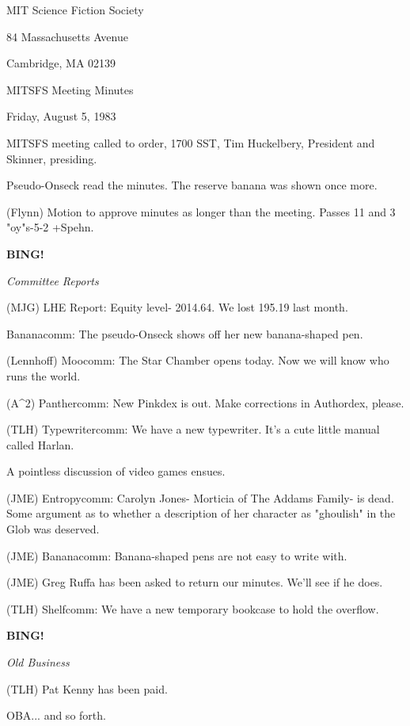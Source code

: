 \documentclass[12pt]{article}
\newcommand{\bing}{{\bf BING!} }
\newcommand{\goto}[1]{\bing \vskip 12pt \centerline{{\em{#1}}}}
\begin{document}
\begin{center}

MIT Science Fiction Society 

84 Massachusetts Avenue

Cambridge, MA 02139

\vspace{12pt}

MITSFS Meeting Minutes 

Friday, August 5, 1983

\end{center}
 
\vspace{18pt}

\setlength{\parskip}{6pt}

\noindent
MITSFS meeting called to order, 1700 SST,
Tim Huckelbery, President and Skinner, presiding.

Pseudo-Onseck read the minutes. The reserve banana was shown once more.

(Flynn) Motion to approve minutes as longer than the meeting. Passes 11 and 3 "oy"s-5-2 +Spehn.

\goto{Committee Reports}

(MJG) LHE Report: Equity level- 2014.64. We lost 195.19 last month.

Bananacomm: The pseudo-Onseck shows off her new banana-shaped pen.

(Lennhoff) Moocomm: The Star Chamber opens today. Now we will know who runs the world.

(A^2) Panthercomm: New Pinkdex is out. Make corrections in Authordex, please.

(TLH) Typewritercomm: We have a new typewriter. It's a cute little manual called Harlan.

A pointless discussion of video games ensues.

(JME) Entropycomm: Carolyn Jones- Morticia of The Addams Family- is dead. Some argument as to whether a description of her character as "ghoulish" in the Glob was deserved.

(JME) Bananacomm: Banana-shaped pens are not easy to write with.

(JME) Greg Ruffa has been asked to return our minutes. We'll see if he does.

(TLH) Shelfcomm: We have a new temporary bookcase to hold the overflow.

\goto{Old Business}

(TLH) Pat Kenny has been paid.

OBA... and so forth.
\end{document}

